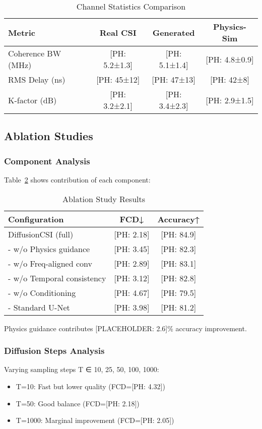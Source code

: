 \documentclass[journal]{IEEEtran}
\begin{document}
\begin{table}[h]
\centering
\caption{Channel Statistics Comparison}
\label{tab:statistics}
\begin{tabular}{lccc}
\toprule
Metric & Real CSI & Generated & Physics-Sim \\
\midrule
Coherence BW (MHz) & [PH: 5.2±1.3] & [PH: 5.1±1.4] & [PH: 4.8±0.9] \\
RMS Delay (ns) & [PH: 45±12] & [PH: 47±13] & [PH: 42±8] \\
K-factor (dB) & [PH: 3.2±2.1] & [PH: 3.4±2.3] & [PH: 2.9±1.5] \\
\bottomrule
\end{tabular}
\end{table}

\subsection{Ablation Studies}

\subsubsection{Component Analysis}
Table~\ref{tab:ablation} shows contribution of each component:

\begin{table}[h]
\centering
\caption{Ablation Study Results}
\label{tab:ablation}
\begin{tabular}{lcc}
\toprule
Configuration & FCD↓ & Accuracy↑ \\
\midrule
DiffusionCSI (full) & [PH: 2.18] & [PH: 84.9] \\
- w/o Physics guidance & [PH: 3.45] & [PH: 82.3] \\
- w/o Freq-aligned conv & [PH: 2.89] & [PH: 83.1] \\
- w/o Temporal consistency & [PH: 3.12] & [PH: 82.8] \\
- w/o Conditioning & [PH: 4.67] & [PH: 79.5] \\
- Standard U-Net & [PH: 3.98] & [PH: 81.2] \\
\bottomrule
\end{tabular}
\end{table}

Physics guidance contributes [PLACEHOLDER: 2.6]\% accuracy improvement.

\subsubsection{Diffusion Steps Analysis}
Varying sampling steps T ∈ {10, 25, 50, 100, 1000}:
\begin{itemize}
\item T=10: Fast but lower quality (FCD=[PH: 4.32])
\item T=50: Good balance (FCD=[PH: 2.18])
\item T=1000: Marginal improvement (FCD=[PH: 2.05])
\end{itemize}
\end{document}
